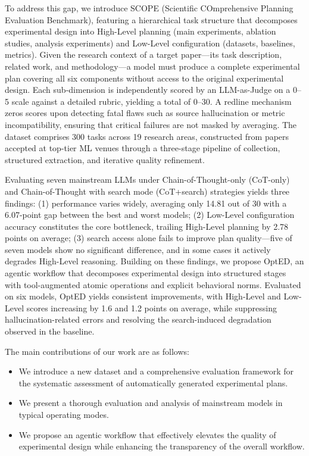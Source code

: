 \documentclass[letterpaper]{article} %
\begin{document}
To address this gap, we introduce \textsc{SCOPE} (Scientific COmprehensive Planning Evaluation Benchmark), featuring a hierarchical task structure that decomposes experimental design into High-Level planning (main experiments, ablation studies, analysis experiments) and Low-Level configuration (datasets, baselines, metrics). Given the research context of a target paper—its task description, related work, and methodology—a model must produce a complete experimental plan covering all six components without access to the original experimental design. Each sub-dimension is independently scored by an LLM-as-Judge on a 0--5 scale against a detailed rubric, yielding a total of 0--30. A redline mechanism zeros scores upon detecting fatal flaws such as source hallucination or metric incompatibility, ensuring that critical failures are not masked by averaging. The dataset comprises 300 tasks across 19 research areas, constructed from papers accepted at top-tier ML venues through a three-stage pipeline of collection, structured extraction, and iterative quality refinement.

Evaluating seven mainstream LLMs under Chain-of-Thought-only (CoT-only) and Chain-of-Thought with search mode (CoT+search) strategies yields three findings: (1) performance varies widely, averaging only 14.81 out of 30 with a 6.07-point gap between the best and worst models; (2) Low-Level configuration accuracy constitutes the core bottleneck, trailing High-Level planning by 2.78 points on average; (3) search access alone fails to improve plan quality---five of seven models show no significant difference, and in some cases it actively degrades High-Level reasoning. Building on these findings, we propose OptED, an agentic workflow that decomposes experimental design into structured stages with tool-augmented atomic operations and explicit behavioral norms. Evaluated on six models, OptED yields consistent improvements, with High-Level and Low-Level scores increasing by 1.6 and 1.2 points on average, while suppressing hallucination-related errors and resolving the search-induced degradation observed in the baseline.

The main contributions of our work are as follows:
\begin{itemize}
    \item We introduce a new dataset and a comprehensive evaluation framework for the systematic assessment of automatically generated experimental plans.
    \item We present a thorough evaluation and analysis of mainstream models in typical operating modes.
    \item We propose an agentic workflow that effectively elevates the quality of experimental design while enhancing the transparency of the overall workflow.
\end{itemize}
\end{document}

